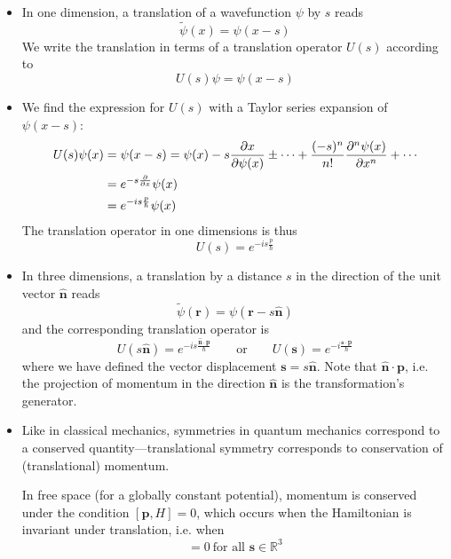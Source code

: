 \documentclass[11pt, a4paper]{article}
\newcommand{\eqtext}[1]{\qquad \text{#1} \qquad}
\renewcommand{\vec}[1]{\bm{#1}}  %
\newcommand{\uvec}[1]{\hat{\vec{#1}}}  %
\renewcommand{\r}{\vec{r}}  %
\newcommand{\p}{\psi}  %
\begin{document}
\begin{itemize}
	\item In one dimension, a translation of a wavefunction $ \p $ by $ s $ reads
	\begin{equation*}
		\tilde{\p}(x) = \p(x - s)
	\end{equation*}
	We write the translation in terms of a translation operator $ U(s) $ according to
	\begin{equation*}
		U(s)\p = \p(x - s)
	\end{equation*}
	
	\item We find the expression for $ U(s) $ with a Taylor series expansion of $ \p(x - s) $:
	\begin{align*}
		U(s)\p(x) &= \p(x - s) = \p(x) - s \pdv{x}{\p(x)} \pm  \cdots + \frac{(-s)^{n}}{n!}\pdv[n]{\p(x)}{x} + \cdots \\
		& = e^{-s \pdv{x}}\p(x) \\
		& = e^{-is\frac{p}{\hbar}}\p(x)
	\end{align*}
	The translation operator in one dimensions is thus
	\begin{equation*}
		U(s) = e^{-is\frac{p}{\hbar}}
	\end{equation*}
	
	\item In three dimensions, a translation by a distance $ s $ in the direction of the unit vector $ \uvec{n} $ reads
	\begin{equation*}
		\tilde{\p}(\r) = \p(\r - s\uvec{n})
	\end{equation*}
	and the corresponding translation operator is
	\begin{equation*}
		U(s \uvec{n}) = e^{-is \frac{\uvec{n}\cdot \vec{p}}{\hbar}} \eqtext{or} U(\vec{s}) = e^{-i \frac{\vec{s}\cdot \vec{p}}{\hbar}}
	\end{equation*}
	where we have defined the vector displacement $ \vec{s} = s \uvec{n} $. Note that $ \uvec{n}\cdot \vec{p} $, i.e. the projection of momentum in the direction $ \uvec{n} $ is the transformation's generator.
	
	\item Like in classical mechanics, symmetries in quantum mechanics correspond to a conserved quantity---translational symmetry corresponds to conservation of (translational) momentum. 
	
	In free space (for a globally constant potential), momentum is conserved under the condition $ [\vec{p}, H] = 0 $, which occurs when the Hamiltonian is invariant under translation, i.e. when
	\begin{equation*}
		[U(\vec{s}), H] = 0 \ \text{for all } \vec{s} \in \mathbb{R}^{3}
	\end{equation*}
	

\end{itemize}
\end{document}
